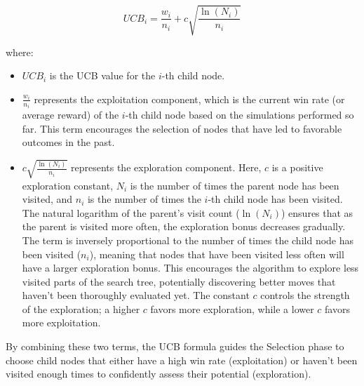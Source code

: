 \begin{itemize}
$$UCB_i = \frac{w_i}{n_i} + c \sqrt{\frac{\ln(N_i)}{n_i}}$$

where:
\begin{itemize}
    \item $UCB_i$ is the UCB value for the $i$-th child node.
    \item $\frac{w_i}{n_i}$ represents the exploitation component, which is the current win rate (or average reward) of the $i$-th child node based on the simulations performed so far. This term encourages the selection of nodes that have led to favorable outcomes in the past.
    \item $c \sqrt{\frac{\ln(N_i)}{n_i}}$ represents the exploration component. Here, $c$ is a positive exploration constant, $N_i$ is the number of times the parent node has been visited, and $n_i$ is the number of times the $i$-th child node has been visited. The natural logarithm of the parent's visit count ($\ln(N_i)$) ensures that as the parent is visited more often, the exploration bonus decreases gradually. The term is inversely proportional to the number of times the child node has been visited ($n_i$), meaning that nodes that have been visited less often will have a larger exploration bonus. This encourages the algorithm to explore less visited parts of the search tree, potentially discovering better moves that haven't been thoroughly evaluated yet. The constant $c$ controls the strength of the exploration; a higher $c$ favors more exploration, while a lower $c$ favors more exploitation.
\end{itemize}
By combining these two terms, the UCB formula guides the Selection phase to choose child nodes that either have a high win rate (exploitation) or haven't been visited enough times to confidently assess their potential (exploration).
\end{itemize}

